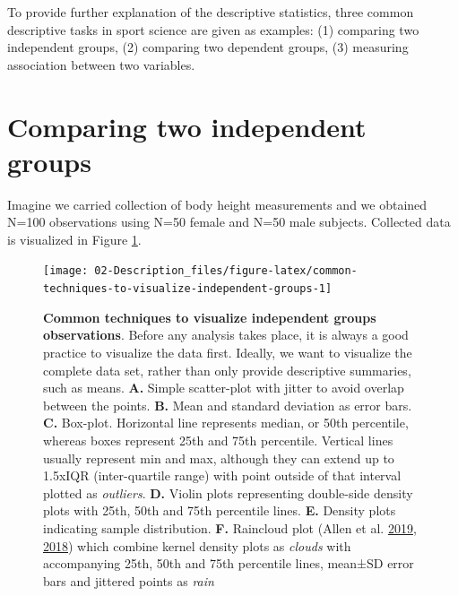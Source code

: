 \documentclass[
]{book}
\begin{document}
To provide further explanation of the descriptive statistics, three common descriptive tasks in sport science are given as examples: (1) comparing two independent groups, (2) comparing two dependent groups, (3) measuring association between two variables.

\hypertarget{comparing-two-independent-groups}{%
\section{Comparing two independent groups}\label{comparing-two-independent-groups}}

Imagine we carried collection of body height measurements and we obtained N=100 observations using N=50 female and N=50 male subjects. Collected data is visualized in Figure \ref{fig:common-techniques-to-visualize-independent-groups}.

\begin{figure}

{\centering \texttt{[image: 02-Description\_files/figure-latex/common-techniques-to-visualize-independent-groups-1]} 

}

\caption{\textbf{Common techniques to visualize independent groups observations}. Before any analysis takes place, it is always a good practice to visualize the data first. Ideally, we want to visualize the complete data set, rather than only provide descriptive summaries, such as means. \textbf{A.} Simple scatter-plot with jitter to avoid overlap between the points. \textbf{B.} Mean and standard deviation as error bars. \textbf{C.} Box-plot. Horizontal line represents median, or 50th percentile, whereas boxes represent 25th and 75th percentile. Vertical lines usually represent min and max, although they can extend up to 1.5xIQR (inter-quartile range) with point outside of that interval plotted as \emph{outliers}. \textbf{D.} Violin plots representing double-side density plots with 25th, 50th and 75th percentile lines. \textbf{E.} Density plots indicating sample distribution. \textbf{F.} Raincloud plot (Allen et al. \protect\hyperlink{ref-allenRaincloudPlotsMultiplatform2019}{2019}, \protect\hyperlink{ref-allenRaincloudplotsTutorialsCodebase2018}{2018}) which combine kernel density plots as \emph{clouds} with accompanying 25th, 50th and 75th percentile lines, mean±SD error bars and jittered points as \emph{rain}}\label{fig:common-techniques-to-visualize-independent-groups}
\end{figure}
\end{document}
